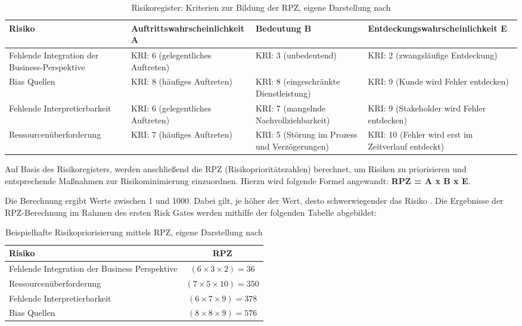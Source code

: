 \begin{table}[!htbp]
\centering
\renewcommand{\arraystretch}{1.3}
\begin{tabular}{|p{3cm}|p{4.9cm}|p{3cm}|p{4.9cm}|}
\hline
\textbf{Risiko} & \textbf{Auftritts\-wahrscheinlichkeit A} & \textbf{Bedeutung B} & \textbf{Entdeckungs\-wahrscheinlichkeit E} \\
\hline

Fehlende Integration der Business-Perspektive 
& KRI: 6 (gelegentliches Auftreten)
& KRI: 3 (unbedeutend)
& KRI: 2 (zwangsläufige Entdeckung) \\
\hline

Bias Quellen 
& KRI: 8 (häufiges Auftreten)
& KRI: 8 (eingeschränkte Dienstleistung)
& KRI: 9 (Kunde wird Fehler entdecken) \\
\hline

Fehlende Interpretierbarkeit 
& KRI: 6 (gelegentliches Auftreten)
& KRI: 7 (mangelnde Nachvollziehbarkeit)
& KRI: 9 (Stakeholder wird Fehler entdecken) \\
\hline

Ressourcen\-überforderung 
& KRI: 7 (häufiges Auftreten)
& KRI: 5 (Störung im Prozess und Verzögerungen)
& KRI: 10 (Fehler wird erst im Zeitverlauf entdeckt) \\
\hline

\end{tabular}
\caption{Risikoregister: Kriterien zur Bildung der RPZ, eigene Darstellung nach \cite{Bundesministerium_2018}}
\label{tab:cs2_rg1_kriterien_rpz}
\end{table}

Auf Basis des Risikoregisters, 
werden anschließend die RPZ (Risikoprioritätszahlen) berechnet, 
um Risiken zu priorisieren und entsprechende Maßnahmen zur 
Risikominimierung einzuordnen. 
Hierzu wird folgende Formel angewandt:
\textbf{RPZ = A x B x E}.

Die Berechnung ergibt Werte zwischen 1 und 1000. Dabei gilt, je höher der Wert, desto schwerwiegender das Risiko \cite{Bundesministerium_2018}. Die Ergebnisse der RPZ-Berechnung im Rahmen des ersten Risk Gates werden mithilfe der folgenden Tabelle abgebildet:

\begin{table}[!htbp]
\centering
\begin{tabular}{|p{9cm}|c|}
\hline
\textbf{Risiko} & \textbf{RPZ} \\ \hline
Fehlende Integration der Business Perspektive & $(6 \times 3 \times 2) = 36$ \\ \hline
Ressourcenüberforderung & $(7 \times 5 \times 10) = 350$ \\ \hline
Fehlende Interpretierbarkeit & $(6 \times 7 \times 9) = 378$ \\ \hline
Bias Quellen & $(8 \times 8 \times 9) = 576$ \\ \hline
\end{tabular}
\caption{Beispielhafte Risikopriorisierung mittels RPZ, eigene Darstellung nach \cite{Bundesministerium_2018}}
\label{tab:cs2_rg1_rpz_risiken}
\end{table}

